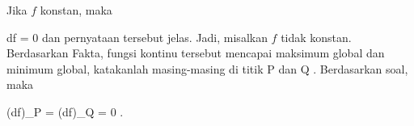 Jika $f$ konstan, maka

\mavergleichskette
{\vergleichskette
{ df
}
{ = }{ 0
}
{  }{
}
{    }{
}
{   }{
}
}
{}{}{}
dan pernyataan tersebut jelas. Jadi, misalkan $f$ tidak konstan. Berdasarkan
Fakta,
fungsi kontinu tersebut mencapai maksimum global dan minimum global, katakanlah masing-masing di titik
\mathkor {} {P} {dan} {Q} {.}
Berdasarkan
soal,
maka

\mavergleichskettedisp
{\vergleichskette
{ (df)_P
}
{ =} { (df)_Q
}
{ =} { 0
}
{ } {
}
{ } {
}
}
{}{}{.}
